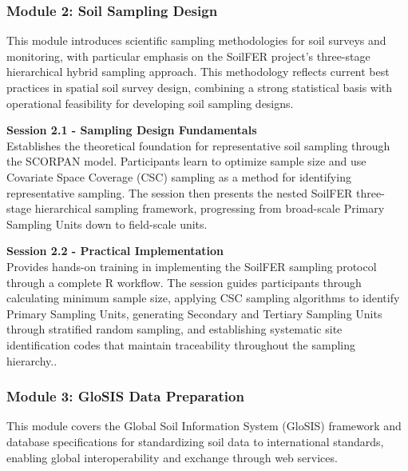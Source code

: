 \documentclass[
  10pt,
  b5paper,
  oneside]{book}
\begin{document}
\subsubsection*{\texorpdfstring{\textbf{Module 2: Soil Sampling Design}}{Module 2: Soil Sampling Design}}\label{module-2-soil-sampling-design}

This module introduces scientific sampling methodologies for soil surveys and monitoring, with particular emphasis on the SoilFER project's three-stage hierarchical hybrid sampling approach. This methodology reflects current best practices in spatial soil survey design, combining a strong statistical basis with operational feasibility for developing soil sampling designs.

\textbf{Session 2.1 - Sampling Design Fundamentals}\\
Establishes the theoretical foundation for representative soil sampling through the SCORPAN model. Participants learn to optimize sample size and use Covariate Space Coverage (CSC) sampling as a method for identifying representative sampling. The session then presents the nested SoilFER three-stage hierarchical sampling framework, progressing from broad-scale Primary Sampling Units down to field-scale units.

\textbf{Session 2.2 - Practical Implementation}\\
Provides hands-on training in implementing the SoilFER sampling protocol through a complete R workflow. The session guides participants through calculating minimum sample size, applying CSC sampling algorithms to identify Primary Sampling Units, generating Secondary and Tertiary Sampling Units through stratified random sampling, and establishing systematic site identification codes that maintain traceability throughout the sampling hierarchy..

\subsubsection*{\texorpdfstring{\textbf{Module 3: GloSIS Data Preparation}}{Module 3: GloSIS Data Preparation}}\label{module-3-glosis-data-preparation}

This module covers the Global Soil Information System (GloSIS) framework and database specifications for standardizing soil data to international standards, enabling global interoperability and exchange through web services.
\end{document}
